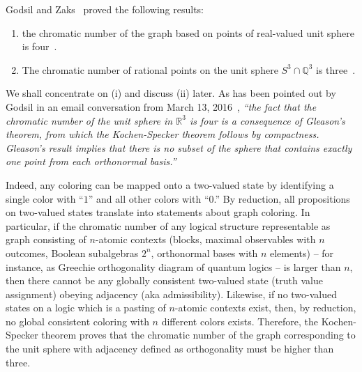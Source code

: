 Godsil and Zaks~\cite{godsil-zaks,havlicek-2000}  proved the following results:
\begin{enumerate}
\item
the chromatic number of the graph based on points of real-valued unit sphere
is four~\cite[Lemma~1.1]{godsil-zaks}.
\item
The chromatic number of rational points on the  unit sphere
$S^3\cap \mathbb{Q}^3$
is three~\cite[Lemma~1.2]{godsil-zaks}.
\end{enumerate}

We shall concentrate on (i) and discuss (ii) later.
As has been pointed out by Godsil in an email conversation from March 13, 2016~\cite{godsil-pc},
{\em ``the fact that the chromatic number of the unit sphere in $\mathbb{R}^3$
is four is a consequence of  Gleason's theorem,
from which the Kochen-Specker theorem follows by compactness.
Gleason's result implies that there is no subset of the sphere that contains exactly one point from each orthonormal basis.''}

Indeed, any coloring can be mapped onto a two-valued state by identifying
a single color with ``$1$'' and all other colors with ``$0$.''
By reduction, all propositions on two-valued states translate into statements about graph coloring.
In particular, if the chromatic number of any logical structure representable as graph consisting of $n$-atomic
contexts
(blocks, maximal observables with $n$ outcomes, Boolean subalgebras $2^n$, orthonormal bases with $n$ elements)
--
for instance, as Greechie orthogonality diagram of quantum logics
--
is larger than $n$,
then there cannot be any globally consistent two-valued state (truth value assignment) obeying adjacency (aka admissibility).
Likewise, if no two-valued states  on a logic
which is a pasting of $n$-atomic contexts
exist, then, by reduction, no global consistent coloring with $n$ different colors exists.
Therefore, the Kochen-Specker theorem proves that the chromatic number of the graph corresponding to
the unit sphere with adjacency defined as orthogonality must be higher than three.





